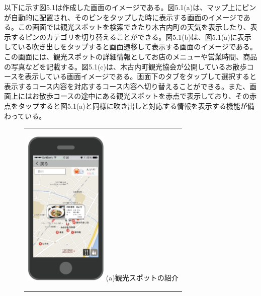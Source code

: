 以下に示す図5.1は作成した画面のイメージである。図5.1(a)は、マップ上にピンが自動的に配置され、そのピンをタップした時に表示する画面のイメージである。この画面では観光スポットを検索できたり木古内町の天気を表示したり、表示するピンのカテゴリを切り替えることができる。図5.1(b)は、図5.1(a)に表示している吹き出しをタップすると画面遷移して表示する画面のイメージである。この画面には、観光スポットの詳細情報としてお店のメニューや営業時間、商品の写真などを記載する。図5.1(c)は、木古内町観光協会が公開しているお散歩コースを表示している画面イメージである。画面下のタブをタップして選択すると表示するコース内容を対応するコース内容へ切り替えることができる。また、画面上にはお散歩コースの途中にある観光スポットを赤点で表示しており、その赤点をタップすると図5.1(a)と同様に吹き出しと対応する情報を表示する機能が備わっている。

\begin{figure}[htbp]
  \begin{center}
    \begin{tabular}{c}

      \begin{minipage}{0.33\hsize}
        \begin{center}
\includegraphics[width=4cm, bb=0 0 303 573]{5.2_map1.png}
          \hspace{1cm} %
          {\footnotesize (a)観光スポットの紹介}
        \end{center}
      \end{minipage}


\end{tabular}
\end{center}
\end{figure}
